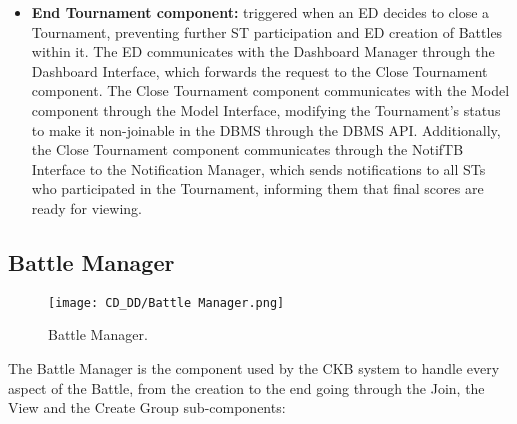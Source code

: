 \begin{itemize}
    \item \textbf{End Tournament component:} triggered when an ED decides to close a Tournament, preventing further ST participation and ED creation of Battles within it. The ED communicates with the Dashboard Manager through the Dashboard Interface, which forwards the request to the Close Tournament component. The Close Tournament component communicates with the Model component through the Model Interface, modifying the Tournament's status to make it non-joinable in the DBMS through the DBMS API. Additionally, the Close Tournament component communicates through the NotifTB Interface to the Notification Manager, which sends notifications to all STs who participated in the Tournament, informing them that final scores are ready for viewing.
\end{itemize}

\subsection{Battle Manager}
\label{subsec:battle_manager}%

\begin{figure}[H]
    \begin{center}
        \texttt{[image: CD\_DD/Battle Manager.png]}
        \caption{Battle Manager.}
        \label{fig:battle_manager}%
    \end{center}
\end{figure}

\noindent The Battle Manager is the component used by the CKB system to handle every aspect of the Battle, from the creation to the end going through the Join, the View and the Create Group sub-components:

